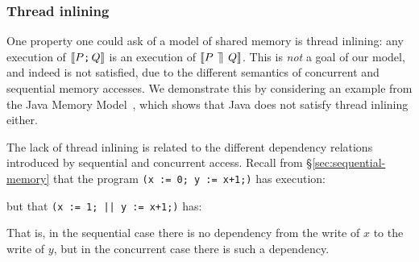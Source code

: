 \subsubsection{Thread inlining}

One property one could ask of a model of shared memory is thread
inlining: any execution of $\llbracket P\texttt{;}\, Q\rrbracket$ is an execution of $\llbracket P
  \,\mathbin{\rrceil}\, Q\rrbracket$. This is \emph{not} a goal of our model, and indeed is not
satisfied, due to the different semantics of concurrent and sequential
memory accesses. We demonstrate this by considering an example from
the Java Memory Model~\cite{Manson:2005:JMM:1047659.1040336}, which shows that Java does not
satisfy thread inlining either.

The lack of thread inlining is related to the different dependency
relations introduced by sequential and concurrent access.
Recall from \S\ref{sec:sequential-memory} that the program
\verb`(x := 0; y := x+1;)` has execution:
\begin{tikzdisplay}[node distance=1em]
\end{tikzdisplay}
but that \verb`(x := 1; || y := x+1;)` has:
\begin{tikzdisplay}[node distance=1em]
\end{tikzdisplay}
That is, in the sequential case there is no dependency from the
write of $x$ to the write of $y$, but in the concurrent case there
is such a dependency.

